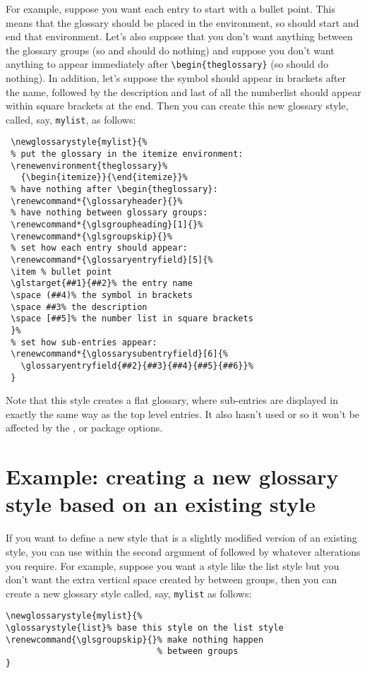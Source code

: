 \documentclass[report]{nlctdoc}
\renewcommand*{\glsgroupskip}{}
\renewcommand*{\glossaryentryfield}[5]{%
    \item[\glsentryitem{#1}\glstarget{#1}{#2}]\mbox{}\newline
      #3\glspostdescription\space #5\newline}%
\newcommand*{\glostyle}[1]{\textsf{#1}\index{glossary styles:>#1={\protect\ttfamily#1}|main}}
\begin{document}
For example, suppose you want each entry to start with a bullet point.
This means that the glossary should be placed in the 
environment, so  should start and end that
environment. Let's also suppose that you don't want anything between
the glossary groups (so  and 
should do nothing) and suppose you don't want anything to appear
immediately after \verb|\begin{theglossary}| (so 
should do nothing). In addition, let's suppose the symbol should
appear in brackets after the name, followed by the description and
last of all the \gls{numberlist} should appear within square brackets
at the end. Then you can create this new glossary style, called, say,
\texttt{mylist}, as follows:
\begin{verbatim}
 \newglossarystyle{mylist}{%
 % put the glossary in the itemize environment:
 \renewenvironment{theglossary}%
   {\begin{itemize}}{\end{itemize}}%
 % have nothing after \begin{theglossary}:
 \renewcommand*{\glossaryheader}{}%
 % have nothing between glossary groups:
 \renewcommand*{\glsgroupheading}[1]{}%
 \renewcommand*{\glsgroupskip}{}%
 % set how each entry should appear:
 \renewcommand*{\glossaryentryfield}[5]{%
 \item % bullet point
 \glstarget{##1}{##2}% the entry name
 \space (##4)% the symbol in brackets
 \space ##3% the description
 \space [##5]% the number list in square brackets
 }%
 % set how sub-entries appear:
 \renewcommand*{\glossarysubentryfield}[6]{%
   \glossaryentryfield{##2}{##3}{##4}{##5}{##6}}%
 }
\end{verbatim}
Note that this style creates a flat glossary, where sub-entries
are displayed in exactly the same way as the top level entries.
It also hasn't used  or  so
it won't be affected by the ,
 or  package options.

\section{Example: creating a new glossary style based on an
existing style}
\label{sec:exadaptstyle}

If you want to define a new style that is a slightly modified
version of an existing style, you can use 
within the second argument of  followed by
whatever alterations you require. For example, suppose you want 
a style like the \glostyle{list} style but you don't want the extra
vertical space created by  between groups, then you
can create a new glossary style called, say, \texttt{mylist} as
follows:
\begin{verbatim}
\newglossarystyle{mylist}{%
\glossarystyle{list}% base this style on the list style
\renewcommand{\glsgroupskip}{}% make nothing happen 
                              % between groups
}
\end{verbatim} 
\end{document}

